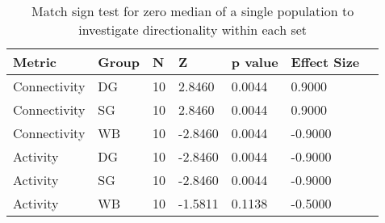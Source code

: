 \begin{table}
\centering
\begin{tabular}[0.2em]{@{}lllllll@{}}\toprule
Metric & Group & N & Z & p value & Effect Size\\\toprule[0.2em]
Connectivity & DG & 10 & 2.8460 & 0.0044 & 0.9000 \\\midrule
Connectivity & SG & 10 & 2.8460 & 0.0044 & 0.9000 \\\midrule
Connectivity & WB & 10 & -2.8460 & 0.0044 & -0.9000 \\\midrule
Activity & DG & 10 & -2.8460 & 0.0044 & -0.9000 \\\midrule
Activity & SG & 10 & -2.8460 & 0.0044 & -0.9000 \\\midrule
Activity & WB & 10 & -1.5811 & 0.1138 & -0.5000 \\\bottomrule[0.2em]
\end{tabular}
\caption{Match sign test for zero median of a single population to investigate directionality within each set\label{tabel:matchSets}}
\end{table}
